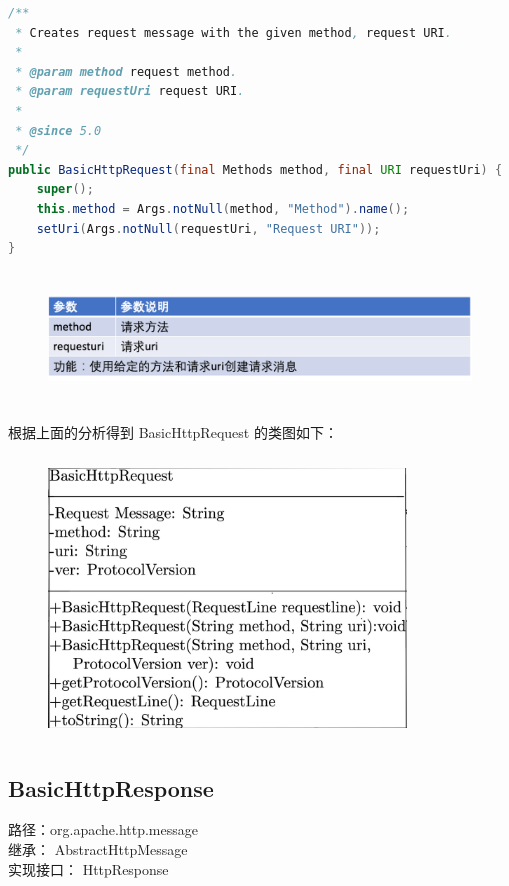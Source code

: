 \documentclass{article}
\begin{document}
	\begin{lstlisting}[language={java}]
/**
 * Creates request message with the given method, request URI.
 *
 * @param method request method.
 * @param requestUri request URI.
 *
 * @since 5.0
 */
public BasicHttpRequest(final Methods method, final URI requestUri) {
    super();
    this.method = Args.notNull(method, "Method").name();
    setUri(Args.notNull(requestUri, "Request URI"));
}

	\end{lstlisting}
	\begin{figure}[H]
		\centering
		\includegraphics[height = 3.5cm, width = 18cm]{pics/20_Request_table_3_6.png}	
	\end{figure}

	\begin{CJK}{UTF8}{gbsn}
		\noindent 根据上面的分析得到 BasicHttpRequest 的类图如下：\\
	\end{CJK}{}

	\begin{figure}[H]
		\centering
		\includegraphics[height = 7.5cm, width = 9.5cm]{pics/33_BasicHttpRequest_UML.JPG}	
	\end{figure}

	\clearpage

	\subsection{BasicHttpResponse}
	\begin{CJK}{UTF8}{gbsn}
		路径：org.apache.http.message\\
		继承： AbstractHttpMessage\\
		实现接口： HttpResponse
	\end{CJK}{}
\end{document}
